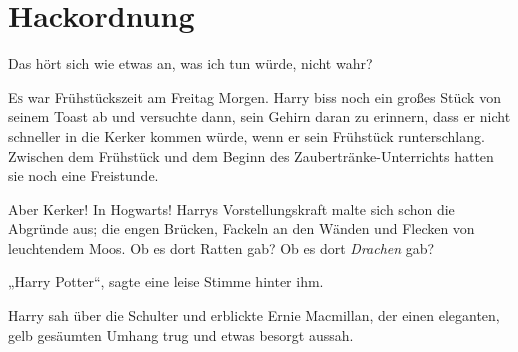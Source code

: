 \chapter{Hackordnung}

\begin{chapterOpeningAuthorNote}
\end{chapterOpeningAuthorNote}
\begin{chapterOpeningQuote}
Das hört sich wie etwas an, was ich tun würde, nicht wahr?
\end{chapterOpeningQuote}

\lettrine{E}{s} war Frühstückszeit am Freitag Morgen. Harry biss noch ein großes Stück von seinem Toast ab und versuchte dann, sein Gehirn daran zu erinnern, dass er nicht schneller in die Kerker kommen würde, wenn er sein Frühstück runterschlang. Zwischen dem Frühstück und dem Beginn des Zaubertränke-Unterrichts hatten sie noch eine Freistunde.

Aber Kerker! In Hogwarts! Harrys Vorstellungskraft malte sich schon die Abgründe aus; die engen Brücken, Fackeln an den Wänden und Flecken von leuchtendem Moos. Ob es dort Ratten gab? Ob es dort \emph{Drachen} gab?

„Harry Potter“, sagte eine leise Stimme hinter ihm.

Harry sah über die Schulter und erblickte Ernie Macmillan, der einen eleganten, gelb gesäumten Umhang trug und etwas besorgt aussah.

